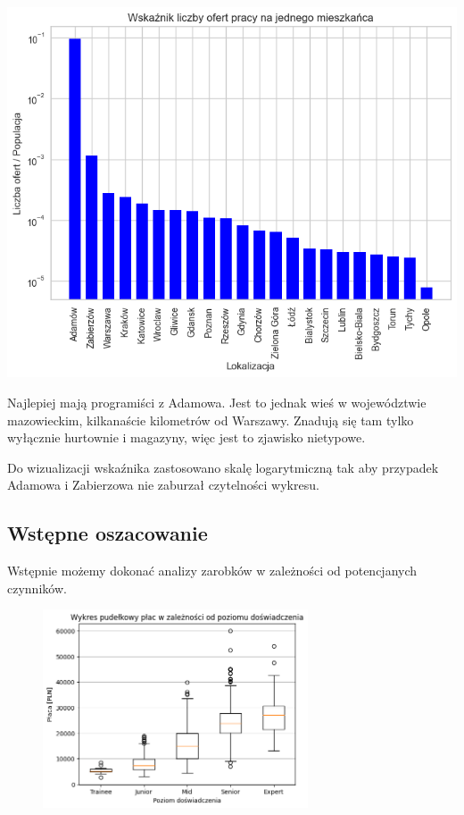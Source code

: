 \documentclass{article}
\begin{document}
\begin{center}
    \includegraphics[scale=0.5]{img/location_job_per_pop.png}
\end{center}

Najlepiej mają programiści z Adamowa. Jest to jednak wieś w województwie mazowieckim,
kilkanaście kilometrów od Warszawy.
Znadują się tam tylko wyłącznie hurtownie i magazyny, więc jest to zjawisko nietypowe.

Do wizualizacji wskaźnika zastosowano skalę logarytmiczną tak
aby przypadek Adamowa i Zabierzowa nie zaburzał czytelności wykresu.

\subsection{Wstępne oszacowanie}

Wstępnie możemy dokonać analizy zarobków w zależności od potencjanych czynników.

\begin{figure}[!hbt]
    \centering
    \includegraphics[width=0.7\textwidth]{img/box_zarobki_exp.png}
\end{figure}
\end{document}
